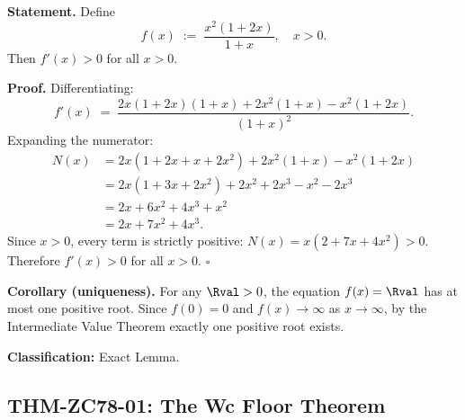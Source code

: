 \documentclass[12pt, a4paper]{article}
\begin{document}

\begin{formalbox}[title={LEM-ZC78-01: $f(x)=x^2(1+2x)/(1+x)$ is
  Strictly Increasing on $x>0$ ($R_0$, Exact)}]

\textbf{Statement.}
Define
\begin{equation}
  f(x) \;:=\; \frac{x^2(1+2x)}{1+x}, \quad x > 0.
  \label{eq:f-def}
\end{equation}
Then $f'(x) > 0$ for all $x > 0$.

\textbf{Proof.}
Differentiating:
\[
  f'(x)
  \;=\;
  \frac{2x(1+2x)(1+x) + 2x^2(1+x) - x^2(1+2x)}{(1+x)^2}.
\]
Expanding the numerator:
\begin{align*}
  N(x)
  &= 2x(1+2x+x+2x^2) + 2x^2(1+x) - x^2(1+2x) \\
  &= 2x(1+3x+2x^2) + 2x^2 + 2x^3 - x^2 - 2x^3 \\
  &= 2x + 6x^2 + 4x^3 + x^2 \\
  &= 2x + 7x^2 + 4x^3.
\end{align*}
Since $x > 0$, every term is strictly positive:
$N(x) = x(2 + 7x + 4x^2) > 0$.
Therefore $f'(x) > 0$ for all $x > 0$. \hfill$\square$

\textbf{Corollary (uniqueness).}
For any $\Rval > 0$, the equation $f(x) = \Rval$ has at most one
positive root. Since $f(0) = 0$ and $f(x) \to \infty$ as
$x \to \infty$, by the Intermediate Value Theorem exactly one
positive root exists.

\textbf{Classification:} Exact Lemma.
\end{formalbox}

\subsection{THM-ZC78-01: The Wc Floor Theorem}
\label{sec:thm}

\end{document}
